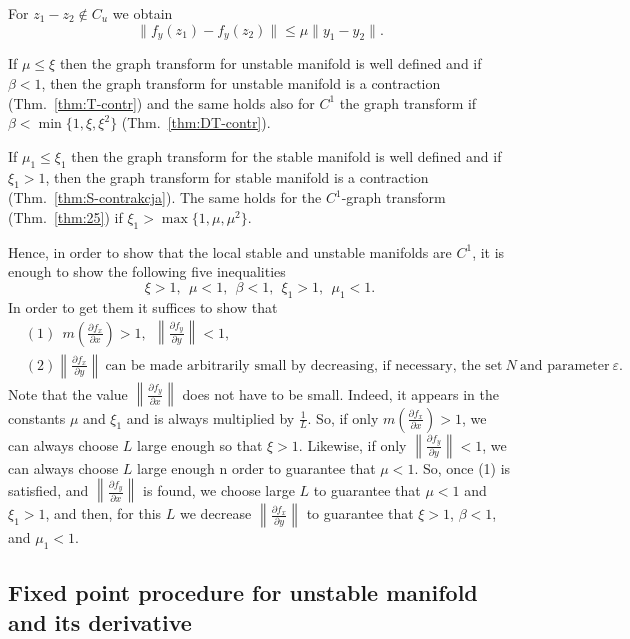 \documentclass[11pt, leqno]{amsart}
\theoremstyle{definition}
\begin{document}
For $z_1 - z_2 \notin C_u$ we obtain
\begin{equation}
  \|f_y(z_1)-f_y(z_2)\| \leq \mu \|y_1 - y_2\|. \label{eq:contr-not-cu}
\end{equation}


If $\mu\leq \xi$ then the graph transform for unstable manifold is well defined and if $\beta < 1$, then the graph transform for unstable manifold is a contraction (Thm.~\ref{thm:T-contr}) and the same holds also for $C^1$ the graph transform if $\beta < \min\{1,\xi,\xi^2\}$ (Thm.~\ref{thm:DT-contr}).

If $\mu_1\leq \xi_1$ then the graph transform for the stable manifold is well defined and if $\xi_1 >1$, then the graph transform for stable manifold is a contraction (Thm.~\ref{thm:S-contrakcja}). The same holds for the $C^1$-graph transform (Thm.~\ref{thm:25}) if $\xi_1 > \max\{1,\mu,\mu^2\}$.

Hence, in order to show that the local stable and unstable manifolds are $C^1$, it is enough to show the following five inequalities
\begin{equation}\label{eq:bounds_constants}
	\xi > 1,\ \  \mu < 1,\ \   \beta < 1,\ \  \xi_1 > 1, \ \ \mu_1 < 1.
\end{equation}
In order to get them it suffices to show that
\begin{align*}
	& (1) \ \ m\left(\frac{\partial f_x}{\partial x}\right) > 1,\ \  \left\|\frac{\partial f_y}{\partial y}\right\| < 1,\\
	& (2) \left\|\frac{\partial f_x}{\partial y}\right\|\  \textrm{can be made arbitrarily small by decreasing, if necessary, the set}\ N\ \textrm{and parameter}\ \varepsilon. 
\end{align*}
Note that the value $ \left\|\frac{\partial f_y}{\partial x}\right\|$ does not have to be small. Indeed, it appears in the constants $\mu$ and $\xi_1$ and is always multiplied by $\frac{1}{L}$. So, if only $m\left(\frac{\partial f_x}{\partial x}\right) > 1$, we can always choose $L$ large enough so that $\xi>1$. Likewise, if only $\left\|\frac{\partial f_y}{\partial y}\right\| < 1$, we can always choose $L$ large enough n order to guarantee that $\mu<1$. So, once (1) is satisfied, and $ \left\|\frac{\partial f_y}{\partial x}\right\|$ is found, we choose large $L$ to guarantee that $\mu<1$ and $\xi_1>1$, and then, for this $L$ we decrease $ \left\|\frac{\partial f_x}{\partial y}\right\|$ to guarantee that $\xi>1$, $\beta<1$, and $\mu_1<1$. 


\subsection{Fixed point procedure for unstable manifold and its derivative}\label{fix_unstable}
\end{document}
